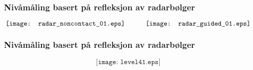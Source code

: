\documentclass[aspectratio=169,xcolor=dvipsnames]{beamer}
\begin{document}
%
\begin{frame}
	\frametitle{Nivåmåling basert på refleksjon av radarbølger}

$$\texttt{[image: radar\_noncontact\_01.eps]} \hskip 30pt \texttt{[image: radar\_guided\_01.eps]}$$
\end{frame}
%
%
%
%
\begin{frame}
	\frametitle{Nivåmåling basert på refleksjon av radarbølger}

$$\texttt{[image: level41.eps]}$$
\end{frame}
%
%
\end{document}
